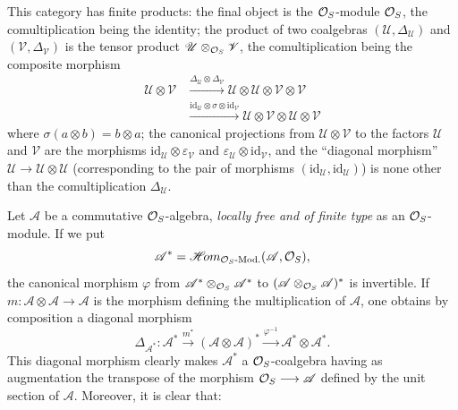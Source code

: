 This category has finite products: the final object is the $\mathcal{O}_S$-module $\mathcal{O}_S$, the comultiplication being the identity; the product of two coalgebras $(\mathscr U,\Delta_{\mathscr U})$ and $(\mathscr V,\Delta_{\mathscr V})$ is the tensor product $\mathscr U\otimes_{\mathcal{O}_S}\mathscr V$, the comultiplication being the composite morphism
\[
\begin{aligned}
\mathscr U\otimes\mathscr V&\xrightarrow{\Delta_{\mathscr U}\otimes\Delta_{\mathscr V}}\mathscr U\otimes\mathscr U\otimes\mathscr V\otimes\mathscr V\\
&\xrightarrow{\mathrm{id}_{\mathscr U}\otimes\sigma\otimes\mathrm{id}_{\mathscr V}}\mathscr U\otimes\mathscr V\otimes\mathscr U\otimes\mathscr V
\end{aligned}
\]
where $\sigma(a\otimes b)=b\otimes a$; the canonical projections from $\mathscr U\otimes\mathscr V$ to the factors $\mathscr U$ and $\mathscr V$ are the morphisms $\mathrm{id}_{\mathscr U}\otimes\varepsilon_{\mathscr V}$ and $\varepsilon_{\mathscr U}\otimes\mathrm{id}_{\mathscr V}$, and the ``diagonal morphism'' $\mathscr U\to\mathscr U\otimes\mathscr U$ (corresponding to the pair of morphisms $(\mathrm{id}_{\mathscr U},\mathrm{id}_{\mathscr U})$) is none other than the comultiplication $\Delta_{\mathscr U}$.

Let $\mathscr A$ be a commutative $\mathcal{O}_S$-algebra, \emph{locally free and of finite type} as an $\mathcal{O}_S$-module. If we put
\[
\mathscr A^*=\mathscr H\!om_{\mathcal{O}_S\text{-Mod.}}(\mathscr A,\mathcal{O}_S),
\]
the canonical morphism $\varphi$ from $\mathscr A^*\otimes_{\mathcal{O}_S}\mathscr A^*$ to $(\mathscr A\otimes_{\mathcal{O}_S}\mathscr A)^*$ is invertible. If $m:\mathscr A\otimes\mathscr A\to\mathscr A$ is the morphism defining the multiplication of $\mathscr A$, one obtains by composition a diagonal morphism
\[
\Delta_{\mathscr A^*}:\mathscr A^*\xrightarrow{m^*}(\mathscr A\otimes\mathscr A)^*\xrightarrow{\varphi^{-1}}\mathscr A^*\otimes\mathscr A^*.
\]
This diagonal morphism clearly makes $\mathscr A^*$ a $\mathcal{O}_S$-coalgebra having as augmentation the transpose of the morphism $\mathcal{O}_S\longrightarrow\mathscr A$ defined by the unit section of $\mathscr A$. Moreover, it is clear that:


